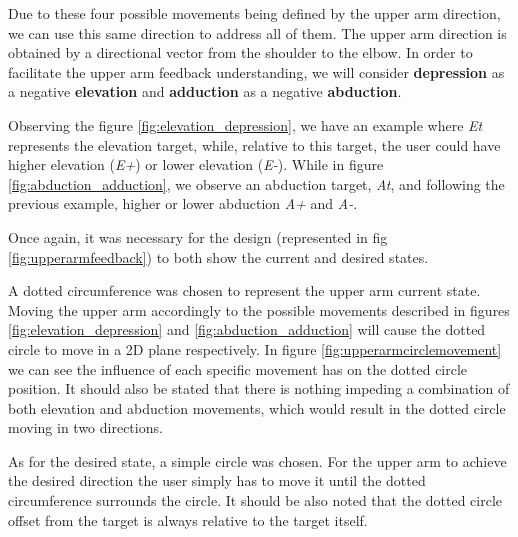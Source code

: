 Due to these four possible movements being defined by the upper arm direction, we can use this same direction to address all of them. 
The upper arm direction is obtained by a directional vector from the shoulder to the elbow.
In order to facilitate the upper arm feedback understanding, we will consider \textbf{depression} as a negative \textbf{elevation} and \textbf{adduction} as a negative \textbf{abduction}.

Observing the figure \ref{fig:elevation_depression}, we have an example where \textit{Et} represents the elevation target, while, relative to this target, the user could have higher elevation (\textit{E+}) or lower elevation (\textit{E-}).
While in figure \ref{fig:abduction_adduction}, we observe an abduction target, \textit{At}, and following the previous example, higher or lower abduction \textit{A+} and \textit{A-}.

Once again, it was necessary for the design (represented in fig \ref{fig:upperarmfeedback}) to both show the current and desired states. 


A dotted circumference was chosen to represent the upper arm current state. Moving the upper arm accordingly to the possible movements described in figures \ref{fig:elevation_depression} and \ref{fig:abduction_adduction} will cause the dotted circle to move in a 2D plane respectively. 
In figure \ref{fig:upperarmcirclemovement} we can see the influence of each specific movement has on the dotted circle position. 
It should also be stated that there is nothing impeding a combination of both elevation and abduction movements, which would result in the dotted circle moving in two directions.

As for the desired state, a simple circle was chosen. 
For the upper arm to achieve the desired direction the user simply has to move it until the dotted circumference surrounds the circle.
It should be also noted that the dotted circle offset from the target is always relative to the target itself.

